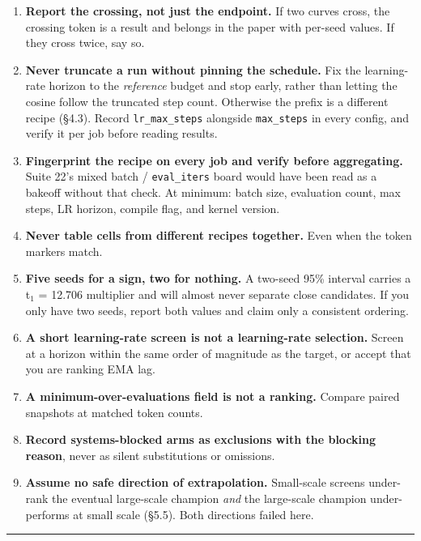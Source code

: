 \begin{enumerate}
\def\labelenumi{\arabic{enumi}.}
\tightlist
\item
  \textbf{Report the crossing, not just the endpoint.} If two curves cross, the crossing token is a
  result and belongs in the paper with per-seed values. If they cross twice, say so.
\item
  \textbf{Never truncate a run without pinning the schedule.} Fix the learning-rate horizon to the
  \emph{reference} budget and stop early, rather than letting the cosine follow the truncated step
  count. Otherwise the prefix is a different recipe (\S4.3). Record \texttt{lr\_max\_steps} alongside
  \texttt{max\_steps} in every config, and verify it per job before reading results.
\item
  \textbf{Fingerprint the recipe on every job and verify before aggregating.} Suite 22's mixed
  batch / \texttt{eval\_iters} board would have been read as a bakeoff without that check. At minimum:
  batch size, evaluation count, max steps, LR horizon, compile flag, and kernel version.
\item
  \textbf{Never table cells from different recipes together.} Even when the token markers match.
\item
  \textbf{Five seeds for a sign, two for nothing.} A two-seed 95\% interval carries a t$_1$ = 12.706
  multiplier and will almost never separate close candidates. If you only have two seeds, report
  both values and claim only a consistent ordering.
\item
  \textbf{A short learning-rate screen is not a learning-rate selection.} Screen at a horizon within
  the same order of magnitude as the target, or accept that you are ranking EMA lag.
\item
  \textbf{A minimum-over-evaluations field is not a ranking.} Compare paired snapshots at matched
  token counts.
\item
  \textbf{Record systems-blocked arms as exclusions with the blocking reason}, never as silent
  substitutions or omissions.
\item
  \textbf{Assume no safe direction of extrapolation.} Small-scale screens under-rank the eventual
  large-scale champion \emph{and} the large-scale champion under-performs at small scale (\S5.5). Both
  directions failed here.
\end{enumerate}

\begin{center}\rule{0.5\linewidth}{0.5pt}\end{center}

